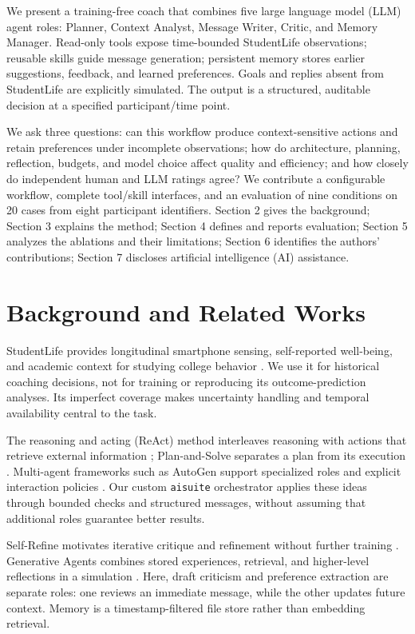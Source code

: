\documentclass{article}
\begin{document}
We present a training-free coach that combines five large language model (LLM) agent roles: Planner, Context Analyst, Message Writer, Critic, and Memory Manager. Read-only tools expose time-bounded StudentLife observations; reusable skills guide message generation; persistent memory stores earlier suggestions, feedback, and learned preferences. Goals and replies absent from StudentLife are explicitly simulated. The output is a structured, auditable decision at a specified participant/time point.

We ask three questions: can this workflow produce context-sensitive actions and retain preferences under incomplete observations; how do architecture, planning, reflection, budgets, and model choice affect quality and efficiency; and how closely do independent human and LLM ratings agree? We contribute a configurable workflow, complete tool/skill interfaces, and an evaluation of nine conditions on 20 cases from eight participant identifiers. Section 2 gives the background; Section 3 explains the method; Section 4 defines and reports evaluation; Section 5 analyzes the ablations and their limitations; Section 6 identifies the authors' contributions; Section 7 discloses artificial intelligence (AI) assistance.

\section{Background and Related Works}
StudentLife provides longitudinal smartphone sensing, self-reported well-being, and academic context for studying college behavior \cite{wang2014studentlife}. We use it for historical coaching decisions, not for training or reproducing its outcome-prediction analyses. Its imperfect coverage makes uncertainty handling and temporal availability central to the task.

The reasoning and acting (ReAct) method interleaves reasoning with actions that retrieve external information \cite{yao2023react}; Plan-and-Solve separates a plan from its execution \cite{wang2023planandsolve}. Multi-agent frameworks such as AutoGen support specialized roles and explicit interaction policies \cite{wu2023autogen}. Our custom \texttt{aisuite} orchestrator applies these ideas through bounded checks and structured messages, without assuming that additional roles guarantee better results.

Self-Refine motivates iterative critique and refinement without further training \cite{madaan2023selfrefine}. Generative Agents combines stored experiences, retrieval, and higher-level reflections in a simulation \cite{park2023generative}. Here, draft criticism and preference extraction are separate roles: one reviews an immediate message, while the other updates future context. Memory is a timestamp-filtered file store rather than embedding retrieval.
\end{document}
